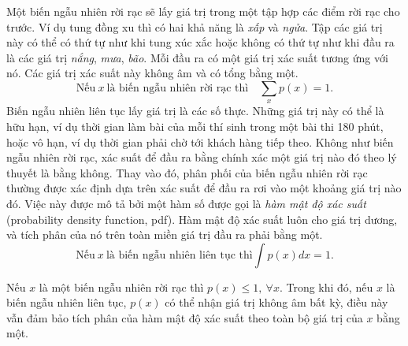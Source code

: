 Một biến ngẫu nhiên rời rạc sẽ lấy giá trị trong một tập hợp các điểm rời rạc
cho trước. Ví dụ tung đồng xu thì có hai khả năng là \textit{xấp} và
\textit{ngửa}. Tập các giá trị này có thể có thứ tự như khi tung xúc xắc hoặc
không có thứ tự như khi đầu ra là các giá trị \textit{nắng}, \textit{mưa},
\textit{bão}. Mỗi đầu ra có một giá trị xác suất tương ứng với nó. Các giá trị
xác suất này không âm và có tổng bằng một.
\begin{equation}
\label{eqn:30_1}
\text{Nếu}~ x ~\text{là biến ngẫu nhiên rời rạc thì}\quad \sum_{x} p(x) = 1.
\end{equation}
Biến ngẫu nhiên liên tục lấy giá trị là các số thực. Những giá trị này có thể là
hữu hạn, ví dụ thời gian làm bài của mỗi thí sinh trong một bài thi 180 phút,
hoặc vô hạn, ví dụ thời gian phải chờ tới khách hàng tiếp theo. Không như biến
ngẫu nhiên rời rạc, xác suất để đầu ra bằng {chính xác} một giá trị nào đó theo
lý thuyết là bằng không. Thay vào đó, phân phối của biến ngẫu nhiên rời rạc
thường được xác định dựa trên xác suất để đầu ra rơi vào một khoảng giá trị nào
đó. Việc này được mô tả bởi một hàm số được gọi là \textit{hàm mật độ xác suất} (probability density function, pdf). Hàm mật độ xác suất
luôn cho giá trị dương, và tích phân của nó trên toàn miền giá trị đầu ra phải
bằng một.
\begin{equation}
\label{eqn:30_2}
\text{Nếu}~ x ~\text{là biến ngẫu nhiên liên tục thì} \int p(x)dx = 1.
\end{equation}

\begin{mynote}
Nếu $x$ là một biến ngẫu nhiên rời rạc thì $p(x) \leq 1,~\forall x$. Trong khi
đó, nếu $x$ là biến ngẫu nhiên liên tục, $p(x)$ có thể nhận giá trị không âm
bất kỳ, điều này vẫn đảm bảo tích phân của hàm mật độ xác suất theo toàn
bộ giá trị của $x$ bằng một.    %
\end{mynote}


